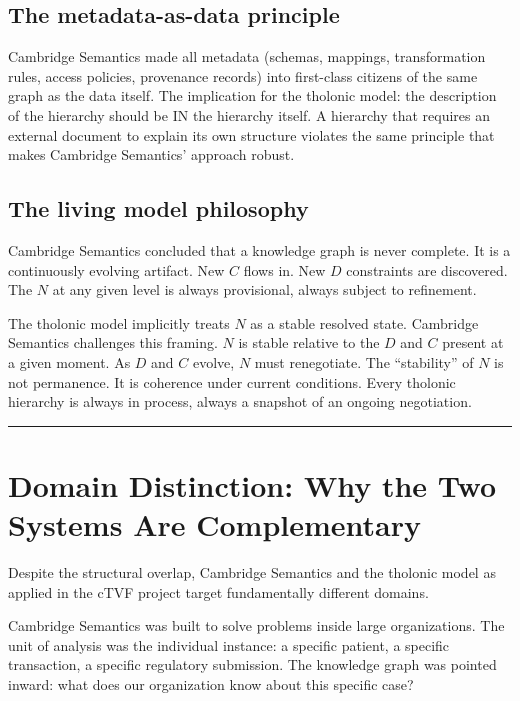 \documentclass[12pt]{article}
\begin{document}
\subsection{The metadata-as-data principle}\label{the-metadata-as-data-principle}

Cambridge Semantics made all metadata (schemas, mappings, transformation
rules, access policies, provenance records) into first-class citizens of
the same graph as the data itself. The implication for the tholonic
model: the description of the hierarchy should be IN the hierarchy
itself. A hierarchy that requires an external document to explain its
own structure violates the same principle that makes Cambridge
Semantics' approach robust.

\subsection{The living model philosophy}\label{the-living-model-philosophy}

Cambridge Semantics concluded that a knowledge graph is never complete.
It is a continuously evolving artifact. New \(C\) flows in. New \(D\)
constraints are discovered. The \(N\) at any given level is always
provisional, always subject to refinement.

The tholonic model implicitly treats \(N\) as a stable resolved state.
Cambridge Semantics challenges this framing. \(N\) is stable relative to
the \(D\) and \(C\) present at a given moment. As \(D\) and \(C\)
evolve, \(N\) must renegotiate. The ``stability'' of \(N\) is not
permanence. It is coherence under current conditions. Every tholonic
hierarchy is always in process, always a snapshot of an ongoing
negotiation.

\begin{center}\rule{0.5\linewidth}{0.5pt}\end{center}

\section{Domain Distinction: Why the Two Systems Are Complementary}\label{domain-distinction-why-the-two-systems-are-complementary}

Despite the structural overlap, Cambridge Semantics and the tholonic
model as applied in the cTVF project target fundamentally different
domains.

Cambridge Semantics was built to solve problems inside large
organizations. The unit of analysis was the individual instance: a
specific patient, a specific transaction, a specific regulatory
submission. The knowledge graph was pointed inward: what does our
organization know about this specific case?
\end{document}
